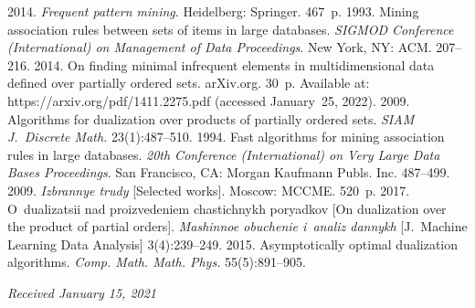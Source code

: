   \begin{multicols}{2}

\renewcommand{\bibname}{\protect\rmfamily References}

{\small\frenchspacing
 {%
 \begin{thebibliography}{9}
 2014. \textit{Frequent pattern mining}. Heidelberg: Springer. 467~p.
 1993. Mining association rules between sets of items in large databases. 
 \textit{SIGMOD  Conference (International) on Management of Data Proceedings}. New York, NY:
 ACM. 207--216. 
 2014. On finding minimal infrequent elements in multidimensional data defined over partially ordered sets. 
 arXiv.org. 30~p. Available at: 
 {\sf https://arxiv.org/\linebreak pdf/1411.2275.pdf} (accessed January~25, 2022).
 2009. Algorithms for dualization over products of partially ordered sets. 
\textit{SIAM J.~Discrete Math.} 23(1):487--510.
 1994. Fast algorithms for mining association rules in large databases. 
 \textit{20th Conference (International) on Very Large Data Bases Proceedings}.
 San Francisco, CA: 
    Morgan Kaufmann Publs. Inc.  487--499.
 2009. \textit{Izbrannye trudy} [Selected works]. Moscow: MCCME. 520~p.
2017. O~dualizatsii nad proizvedeniem chastichnykh poryadkov [On dualization over the product of 
partial orders]. \textit{Mashinnoe obuchenie i~analiz dannykh} [J.~Machine Learning Data Analysis] 
3(4):239--249.
 2015. Asymptotically optimal dualization algorithms. \textit{Comp. Math.
 Math. Phys.} 55(5):891--905. 
 
 \end{thebibliography}

 }
 }

\end{multicols}

\vspace*{-6pt}

\hfill{\small\textit{Received January 15, 2021}}



